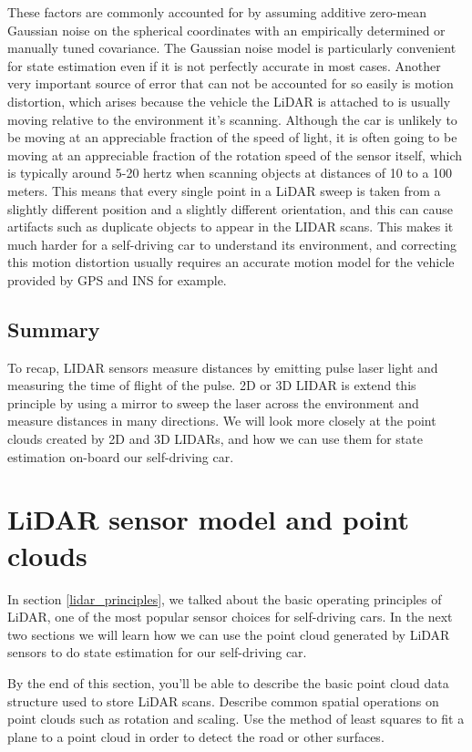 These factors are commonly accounted for by assuming additive zero-mean
Gaussian noise on the spherical coordinates with an empirically determined or
manually tuned covariance.  The Gaussian noise model is
particularly convenient for state estimation even if it is not
perfectly accurate in most cases. Another very important source
of error that can not be accounted for so easily
is motion distortion, which arises because the vehicle
the LiDAR is attached to is usually moving relative to
the environment it's scanning. Although the car is unlikely to be moving at an appreciable fraction
of the speed of light, it is often going to be moving at an appreciable fraction of
the rotation speed of the sensor itself, which is typically around 5-20 hertz when scanning objects at distances
of 10 to a 100 meters. This means that every single point
in a LiDAR sweep is taken from a slightly different position and
a slightly different orientation, and this can cause artifacts such as duplicate objects to
appear in the LIDAR scans. This makes it much harder for a self-driving car to
understand its environment, and correcting this motion
distortion usually requires an accurate motion model for the vehicle provided by GPS and INS for example. 

\subsection{Summary}

To recap, LIDAR sensors
measure distances by emitting pulse laser light and measuring
the time of flight of the pulse. 2D or 3D LIDAR is extend
this principle by using a mirror to sweep the laser across the environment and measure distances in many directions. We will look more closely at the point
clouds created by 2D and 3D LIDARs, and how we can use them for state estimation on-board our self-driving car.

\section{LiDAR sensor model and point clouds}
\label{lidar_and_point_clouds}

In section \ref{lidar_principles}, we talked about the basic operating principles of LiDAR, one of the most popular sensor choices for
self-driving cars. In the next two sections we will learn how we
can use the point cloud generated by LiDAR sensors to do state estimation for
our self-driving car. 

By the end of this section, you'll be able
to describe the basic point cloud data structure used to store LiDAR scans. Describe common spatial operations on
point clouds such as rotation and scaling. Use the method of least squares to
fit a plane to a point cloud in order to detect the road or other surfaces. 

